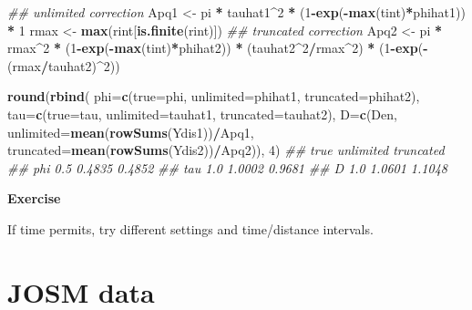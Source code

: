 \documentclass[12pt,]{book}
\newenvironment{Shaded}{\begin{snugshade}}{\end{snugshade}}
\newcommand{\CommentTok}[1]{\textcolor[rgb]{0.56,0.35,0.01}{\textit{#1}}}
\newcommand{\DataTypeTok}[1]{\textcolor[rgb]{0.13,0.29,0.53}{#1}}
\newcommand{\DecValTok}[1]{\textcolor[rgb]{0.00,0.00,0.81}{#1}}
\newcommand{\KeywordTok}[1]{\textcolor[rgb]{0.13,0.29,0.53}{\textbf{#1}}}
\newcommand{\NormalTok}[1]{#1}
\newcommand{\OperatorTok}[1]{\textcolor[rgb]{0.81,0.36,0.00}{\textbf{#1}}}
\newcommand{\StringTok}[1]{\textcolor[rgb]{0.31,0.60,0.02}{#1}}
\let\BeginKnitrBlock\begin \let\EndKnitrBlock\end
\begin{document}
\begin{Shaded}
\begin{Highlighting}[]
\CommentTok{## unlimited correction}
\NormalTok{Apq1 <-}\StringTok{ }\NormalTok{pi }\OperatorTok{*}\StringTok{ }\NormalTok{tauhat1}\OperatorTok{^}\DecValTok{2} \OperatorTok{*}\StringTok{ }\NormalTok{(}\DecValTok{1}\OperatorTok{-}\KeywordTok{exp}\NormalTok{(}\OperatorTok{-}\KeywordTok{max}\NormalTok{(tint)}\OperatorTok{*}\NormalTok{phihat1)) }\OperatorTok{*}\StringTok{ }\DecValTok{1}
\NormalTok{rmax <-}\StringTok{ }\KeywordTok{max}\NormalTok{(rint[}\KeywordTok{is.finite}\NormalTok{(rint)])}
\CommentTok{## truncated correction}
\NormalTok{Apq2 <-}\StringTok{ }\NormalTok{pi }\OperatorTok{*}\StringTok{ }\NormalTok{rmax}\OperatorTok{^}\DecValTok{2} \OperatorTok{*}\StringTok{ }
\StringTok{  }\NormalTok{(}\DecValTok{1}\OperatorTok{-}\KeywordTok{exp}\NormalTok{(}\OperatorTok{-}\KeywordTok{max}\NormalTok{(tint)}\OperatorTok{*}\NormalTok{phihat2)) }\OperatorTok{*}\StringTok{ }
\StringTok{  }\NormalTok{(tauhat2}\OperatorTok{^}\DecValTok{2}\OperatorTok{/}\NormalTok{rmax}\OperatorTok{^}\DecValTok{2}\NormalTok{) }\OperatorTok{*}\StringTok{ }\NormalTok{(}\DecValTok{1}\OperatorTok{-}\KeywordTok{exp}\NormalTok{(}\OperatorTok{-}\NormalTok{(rmax}\OperatorTok{/}\NormalTok{tauhat2)}\OperatorTok{^}\DecValTok{2}\NormalTok{))}

\KeywordTok{round}\NormalTok{(}\KeywordTok{rbind}\NormalTok{(}
  \DataTypeTok{phi=}\KeywordTok{c}\NormalTok{(}\DataTypeTok{true=}\NormalTok{phi, }\DataTypeTok{unlimited=}\NormalTok{phihat1, }\DataTypeTok{truncated=}\NormalTok{phihat2),}
  \DataTypeTok{tau=}\KeywordTok{c}\NormalTok{(}\DataTypeTok{true=}\NormalTok{tau, }\DataTypeTok{unlimited=}\NormalTok{tauhat1, }\DataTypeTok{truncated=}\NormalTok{tauhat2),}
  \DataTypeTok{D=}\KeywordTok{c}\NormalTok{(Den, }\DataTypeTok{unlimited=}\KeywordTok{mean}\NormalTok{(}\KeywordTok{rowSums}\NormalTok{(Ydis1))}\OperatorTok{/}\NormalTok{Apq1,}
      \DataTypeTok{truncated=}\KeywordTok{mean}\NormalTok{(}\KeywordTok{rowSums}\NormalTok{(Ydis2))}\OperatorTok{/}\NormalTok{Apq2)), }\DecValTok{4}\NormalTok{)}
\CommentTok{##     true unlimited truncated}
\CommentTok{## phi  0.5    0.4835    0.4852}
\CommentTok{## tau  1.0    1.0002    0.9681}
\CommentTok{## D    1.0    1.0601    1.1048}
\end{Highlighting}
\end{Shaded}

\BeginKnitrBlock{rmdexercise}
\textbf{Exercise}

If time permits, try different settings and time/distance intervals.
\EndKnitrBlock{rmdexercise}

\hypertarget{josm-data}{%
\section{JOSM data}\label{josm-data}}
\end{document}
